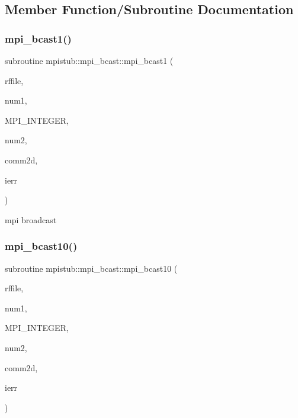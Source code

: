 \subsection{Member Function/\+Subroutine Documentation}
\mbox{\label{interfacempistub_1_1mpi__bcast_a8a625c502574a57694e059e09a85905c}} 
\subsubsection{\texorpdfstring{mpi\_bcast1()}{mpi\_bcast1()}}
{\footnotesize\ttfamily subroutine mpistub\+::mpi\+\_\+bcast\+::mpi\+\_\+bcast1 (\begin{DoxyParamCaption}\item[{double precision, dimension(\+:)}]{rffile,  }\item[{}]{num1,  }\item[{}]{M\+P\+I\+\_\+\+I\+N\+T\+E\+G\+ER,  }\item[{}]{num2,  }\item[{integer}]{comm2d,  }\item[{}]{ierr }\end{DoxyParamCaption})}



mpi broadcast 

\mbox{\label{interfacempistub_1_1mpi__bcast_afbe6a3de7de4368e7acb23b227d84cbe}} 
\subsubsection{\texorpdfstring{mpi\_bcast10()}{mpi\_bcast10()}}
{\footnotesize\ttfamily subroutine mpistub\+::mpi\+\_\+bcast\+::mpi\+\_\+bcast10 (\begin{DoxyParamCaption}\item[{double complex}]{rffile,  }\item[{}]{num1,  }\item[{}]{M\+P\+I\+\_\+\+I\+N\+T\+E\+G\+ER,  }\item[{}]{num2,  }\item[{integer}]{comm2d,  }\item[{}]{ierr }\end{DoxyParamCaption})}

